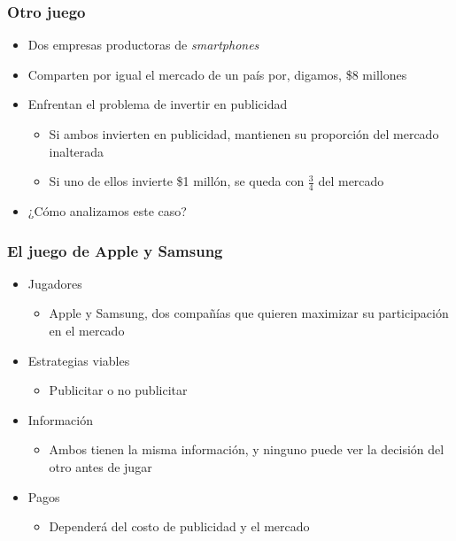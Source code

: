 \documentclass{beamer}
\begin{document}
\begin{frame}
\frametitle{ Otro juego}
\begin{itemize}
    \item Dos empresas productoras de \textit{smartphones}
    \item Comparten por igual el mercado de un país por, digamos, \$8 millones
    \item Enfrentan el problema de invertir en publicidad
        \begin{itemize}
        \item Si ambos invierten en publicidad, mantienen su proporción del mercado inalterada
        \item Si uno de ellos invierte  \$1 millón, se queda con $\frac{3}{4}$ del mercado
        \end{itemize}
    \item ¿Cómo analizamos este caso?    
\end{itemize}
\end{frame}

\begin{frame}
\frametitle{ El juego de Apple y Samsung}
\begin{itemize}
    \item Jugadores
        \begin{itemize}
        \item Apple y Samsung, dos compañías que quieren maximizar su participación en el mercado
        \end{itemize}
    \item Estrategias viables
        \begin{itemize}
        \item Publicitar o no publicitar
        \end{itemize}
    \item Información
        \begin{itemize}
        \item Ambos tienen la misma información, y ninguno puede ver la decisión del otro antes de jugar
        \end{itemize}
    \item Pagos
        \begin{itemize}
        \item Dependerá del costo de publicidad y el mercado
        \end{itemize}
\end{itemize}
\end{frame}
\end{document}
